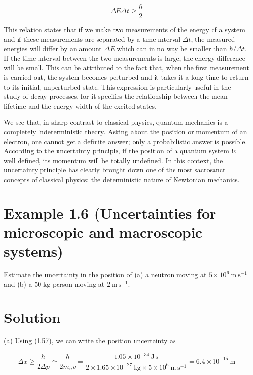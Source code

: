 \documentclass[10pt]{article}
\begin{document}
\begin{equation*}
\Delta E \Delta t \geq \frac{\hbar}{2} \tag{1.58}
\end{equation*}


This relation states that if we make two measurements of the energy of a system and if these measurements are separated by a time interval $\Delta t$, the measured energies will differ by an amount $\Delta E$ which can in no way be smaller than $\hbar / \Delta t$. If the time interval between the two measurements is large, the energy difference will be small. This can be attributed to the fact that, when the first measurement is carried out, the system becomes perturbed and it takes it a long time to return to its initial, unperturbed state. This expression is particularly useful in the study of decay processes, for it specifies the relationship between the mean lifetime and the energy width of the excited states.

We see that, in sharp contrast to classical physics, quantum mechanics is a completely indeterministic theory. Asking about the position or momentum of an electron, one cannot get a definite answer; only a probabilistic answer is possible. According to the uncertainty principle, if the position of a quantum system is well defined, its momentum will be totally undefined. In this context, the uncertainty principle has clearly brought down one of the most sacrosanct concepts of classical physics: the deterministic nature of Newtonian mechanics.

\section*{Example 1.6 (Uncertainties for microscopic and macroscopic systems)}
Estimate the uncertainty in the position of (a) a neutron moving at $5 \times 10^{6} \mathrm{~m} \mathrm{~s}^{-1}$ and (b) a 50 kg person moving at $2 \mathrm{~m} \mathrm{~s}^{-1}$.

\section*{Solution}
(a) Using (1.57), we can write the position uncertainty as


\begin{equation*}
\Delta x \geq \frac{\hbar}{2 \Delta p} \simeq \frac{\hbar}{2 m_{n} v}=\frac{1.05 \times 10^{-34} \mathrm{~J} \mathrm{~s}}{2 \times 1.65 \times 10^{-27} \mathrm{~kg} \times 5 \times 10^{6} \mathrm{~m} \mathrm{~s}^{-1}}=6.4 \times 10^{-15} \mathrm{~m} \tag{1.59}
\end{equation*}
\end{document}
